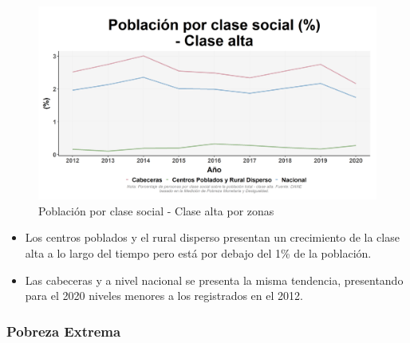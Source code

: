     \begin{figure}[H]
        \caption{Población por clase social - Clase alta por zonas \label{map_result_2} }
        \begin{center}
        \includegraphics[width=\textwidth,keepaspectratio]{img/var_252_trend.png}
        \end{center}
    \end{figure}
            \begin{itemize}
                    \item Los centros poblados y el rural disperso presentan un crecimiento de la clase alta a lo largo del tiempo pero está por debajo del 1\% de la población.
                    \item Las cabeceras y a nivel nacional se presenta la misma tendencia, presentando para el 2020 niveles menores a los registrados en el 2012.
                    \end{itemize}

        \subsubsection{Pobreza Extrema}

